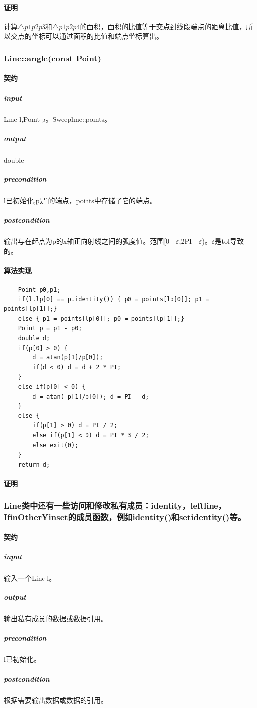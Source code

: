 \documentclass[a4paper]{book}
\numberwithin{equation}{chapter}
\theoremstyle{definition}
\begin{document}
\paragraph{证明}
计算$\triangle p1p2p3$和$\triangle p1p2p4$的面积，面积的比值等于交点到线段端点的距离比值，所以交点的坐标可以通过面积的比值和端点坐标算出。

\subsubsection{Line::angle(const Point)}
\paragraph{契约}
\subparagraph{input}
Line l,Point p。Sweepline::points。
\subparagraph{output}
double
\subparagraph{precondition}
l已初始化,p是l的端点，points中存储了它的端点。
\subparagraph{postcondition}
输出与在起点为p的x轴正向射线之间的弧度值。范围[0 - $\varepsilon$,2PI - $\varepsilon$)。$\varepsilon$是tol导致的。
\paragraph{算法实现}
\begin{lstlisting}
	Point p0,p1;
	if(l.lp[0] == p.identity()) { p0 = points[lp[0]]; p1 = points[lp[1]];}
	else { p1 = points[lp[0]]; p0 = points[lp[1]];}
	Point p = p1 - p0;
	double d;
	if(p[0] > 0) {
		d = atan(p[1]/p[0]);
		if(d < 0) d = d + 2 * PI;
	}
	else if(p[0] < 0) {
		d = atan(-p[1]/p[0]); d = PI - d;
	}
	else {
		if(p[1] > 0) d = PI / 2;
		else if(p[1] < 0) d = PI * 3 / 2;
		else exit(0);
	}
	return d;  
\end{lstlisting}
\paragraph{证明}


\subsubsection {Line类中还有一些访问和修改私有成员：identity，leftline，IfinOtherYinset的成员函数，例如identity()和setidentity()等。}
\paragraph{契约}
\subparagraph{input}
输入一个Line l。
\subparagraph{output}
输出私有成员的数据或数据引用。
\subparagraph{precondition}
l已初始化。
\subparagraph{postcondition}
根据需要输出数据或数据的引用。
\end{document}
